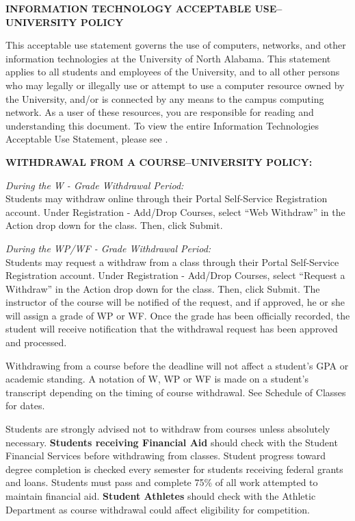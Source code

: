 \documentclass[12pt]{letter}
\newcommand{\customhref}[2]{
	\href{#1}{\color{blue}\burl{#2}}	
}
\begin{document}
\textbf{INFORMATION TECHNOLOGY ACCEPTABLE USE--UNIVERSITY POLICY} \par
This acceptable use statement governs the use of computers, networks, and other information technologies at the University of North Alabama. This statement applies to all students and employees of the University, and to all other persons who may legally or illegally use or attempt to use a computer resource owned by the University, and/or is connected by any means to the campus computing network. As a user of these resources, you are responsible for reading and understanding this document. To view the entire Information Technologies Acceptable Use Statement, please see \customhref{https://www.una.edu/its/una-it-policy.html}{https://www.una.edu/its/una-it-policy.html}.

\textbf{WITHDRAWAL FROM A COURSE--UNIVERSITY POLICY:} \par
\par \textit{During the W - Grade Withdrawal Period:} \\
Students may withdraw online through their Portal Self-Service Registration account.  Under Registration - Add/Drop Courses, select ``Web Withdraw'' in the Action drop down for the class.  Then, click Submit.
\par \textit{During the WP/WF - Grade Withdrawal Period:} \\
Students may request a withdraw from a class through their Portal Self-Service Registration account.  Under Registration - Add/Drop Courses, select ``Request a Withdraw'' in the Action drop down for the class.  Then, click Submit. The instructor of the course will be notified of the request, and if approved, he or she will assign a grade of WP or WF.  Once the grade has been officially recorded, the student will receive notification that the withdrawal request has been approved and processed.
\par Withdrawing from a course before the deadline will not affect a student's GPA or academic standing. A notation of W, WP or WF is made on a student's transcript depending on the timing of course withdrawal. See Schedule of Classes for dates.
\par Students are strongly advised not to withdraw from courses unless absolutely necessary. \textbf{Students receiving Financial Aid} should check with the Student Financial Services before withdrawing from classes. Student progress toward degree completion is checked every semester for students receiving federal grants and loans. Students must pass and complete 75\% of all work attempted to maintain financial aid. \textbf{Student Athletes} should check with the Athletic Department as course withdrawal could affect eligibility for competition.
\end{document}
